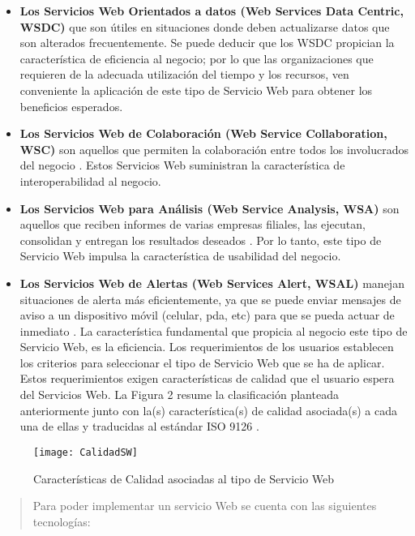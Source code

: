 \documentclass[12pt,letterpaper,titlepage]{article}
\begin{document}
\begin{itemize}\itemsep=0pt
\item \textbf{Los Servicios Web Orientados a datos (Web Services Data Centric, WSDC)} que son útiles en situaciones donde deben actualizarse datos que son alterados frecuentemente. \cite{122} Se puede deducir que los WSDC propician la característica de eficiencia al negocio; por lo que las organizaciones que requieren de la adecuada utilización del tiempo y los recursos, ven conveniente la aplicación de este tipo de Servicio Web para obtener los beneficios esperados.\\
\item \textbf{Los Servicios Web de Colaboración (Web Service Collaboration, WSC)} son aquellos que permiten la colaboración entre todos los involucrados del negocio \cite{122}. Estos Servicios Web suministran la característica de interoperabilidad al negocio.\\
\item \textbf{Los Servicios Web para Análisis (Web Service Analysis, WSA)} son aquellos que reciben informes de varias empresas filiales, las ejecutan, consolidan y entregan los resultados deseados \cite{122}. Por lo tanto, este tipo de Servicio Web impulsa la característica de usabilidad del negocio.
\item \textbf{Los Servicios Web de Alertas (Web Services Alert, WSAL)} manejan situaciones de alerta más eficientemente, ya que se puede enviar mensajes de aviso a un dispositivo móvil (celular, pda, etc) para que se pueda actuar de inmediato \cite{122}. La característica fundamental que propicia al negocio este tipo de Servicio Web, es la eficiencia. Los requerimientos de los usuarios establecen los criterios para seleccionar el tipo de Servicio Web que se ha de aplicar. Estos requerimientos exigen características de calidad que el usuario espera del Servicios Web. La Figura 2 resume la clasificación planteada anteriormente junto con la(s) característica(s) de calidad asociada(s) a cada una de ellas y traducidas al estándar ISO 9126 \cite{123}.
\end{itemize}


\begin{figure}
  \centering
    \texttt{[image: CalidadSW]}
  \caption{Características de Calidad asociadas al tipo de Servicio Web}
  \label{fig2:SW}
\end{figure}



\begin{quotation}
Para poder implementar un servicio Web se cuenta con las siguientes tecnologías:
\end{quotation}
\end{document}
